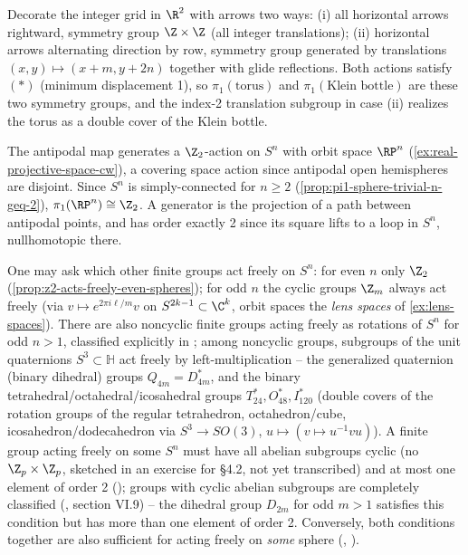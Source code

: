 \begin{example}
\label{ex:grid-symmetries-torus-klein-bottle}
Decorate the integer grid in $\R^2$ with arrows two ways: (i) all horizontal arrows
rightward, symmetry group $\Z\times\Z$ (all integer translations); (ii) horizontal
arrows alternating direction by row, symmetry group generated by translations
$(x,y)\mapsto(x+m,y+2n)$ together with glide reflections. Both actions satisfy
$(*)$ (minimum displacement 1), so $\pi_1(\text{torus})$ and $\pi_1(\text{Klein bottle})$
are these two symmetry groups, and the index-2 translation subgroup in case (ii)
realizes the torus as a double cover of the Klein bottle.
\end{example}

\begin{example}
\label{ex:real-projective-space-covering}
The antipodal map generates a $\Z_2$-action on $S^n$ with orbit space $\RP^n$
(\cref{ex:real-projective-space-cw}), a covering space action since antipodal open
hemispheres are disjoint. Since $S^n$ is simply-connected for $n\ge 2$
(\cref{prop:pi1-sphere-trivial-n-geq-2}), $\pi_1(\RP^n)\cong\Z_2$. A generator is the
projection of a path between antipodal points, and has order exactly 2 since its
square lifts to a loop in $S^n$, nullhomotopic there.
\end{example}

One may ask which other finite groups act freely on $S^n$: for even $n$ only $\Z_2$
(\cref{prop:z2-acts-freely-even-spheres}); for odd $n$ the cyclic groups $\Z_m$ always
act freely (via $v\mapsto e^{2\pi i\ell/m}v$ on $S^{2k-1}\subset\C^k$, orbit spaces the
\emph{lens spaces} of \cref{ex:lens-spaces}). There are also noncyclic
finite groups acting freely as rotations of $S^n$ for odd $n>1$, classified explicitly
in \cite{Wolf1984}; among noncyclic
groups, subgroups of the unit quaternions $S^3\subset\mathbb H$ act freely by
left-multiplication -- the generalized quaternion (binary dihedral) groups
$Q_{4m}=D^*_{4m}$, and the binary tetrahedral/octahedral/icosahedral groups
$T^*_{24},O^*_{48},I^*_{120}$ (double covers of the rotation groups of the regular
tetrahedron, octahedron/cube, icosahedron/dodecahedron via $S^3\to SO(3)$,
$u\mapsto(v\mapsto u^{-1}vu)$). A finite group acting freely on some $S^n$ must have
all abelian subgroups cyclic (no $\Z_p\times\Z_p$, sketched in an exercise for §4.2, not
yet transcribed) and at most one element of order 2 (\cite{Milnor1957}); groups with
cyclic abelian subgroups are completely classified (\cite{Brown1982}, section VI.9) --
the dihedral group $D_{2m}$ for odd $m>1$ satisfies this condition but has more than
one element of order 2. Conversely, both conditions together are also sufficient for
acting freely on \emph{some} sphere (\cite{MadsenThomasWall1976}, \cite{DavisMilgram1985}).

